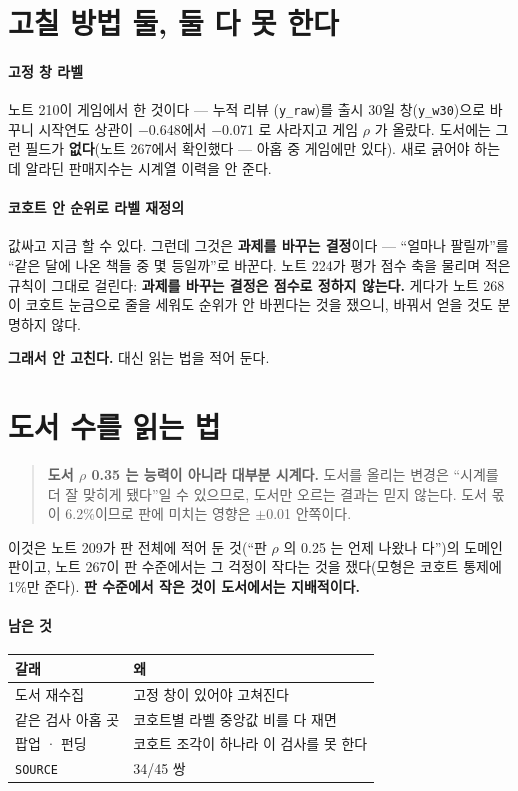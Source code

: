 \documentclass[10pt]{article}
\begin{document}
\section{고칠 방법 둘, 둘 다 못 한다}

\paragraph{고정 창 라벨} 노트 210이 게임에서 한 것이다 --- 누적 리뷰
(\texttt{y\_raw})를 출시 30일 창(\texttt{y\_w30})으로 바꾸니 시작연도 상관이
$-$0.648에서 $-$0.071 로 사라지고 게임 $\rho$ 가 올랐다. 도서에는 그런
필드가 \textbf{없다}(노트 267에서 확인했다 --- 아홉 중 게임에만 있다).
새로 긁어야 하는데 알라딘 판매지수는 시계열 이력을 안 준다.

\paragraph{코호트 안 순위로 라벨 재정의} 값싸고 지금 할 수 있다. 그런데
그것은 \textbf{과제를 바꾸는 결정}이다 --- ``얼마나 팔릴까''를 ``같은 달에
나온 책들 중 몇 등일까''로 바꾼다. 노트 224가 평가 점수 축을 물리며 적은
규칙이 그대로 걸린다: \textbf{과제를 바꾸는 결정은 점수로 정하지 않는다.}
게다가 노트 268이 코호트 눈금으로 줄을 세워도 순위가 안 바뀐다는 것을
쟀으니, 바꿔서 얻을 것도 분명하지 않다.

\textbf{그래서 안 고친다.} 대신 읽는 법을 적어 둔다.

\section{도서 수를 읽는 법}

\begin{quote}
\textbf{도서 $\rho$ 0.35 는 능력이 아니라 대부분 시계다.} 도서를 올리는
변경은 ``시계를 더 잘 맞히게 됐다''일 수 있으므로, 도서만 오르는 결과는
믿지 않는다. 도서 몫이 6.2\%이므로 판에 미치는 영향은 $\pm$0.01 안쪽이다.
\end{quote}

이것은 노트 209가 판 전체에 적어 둔 것(``판 $\rho$ 의 0.25 는 언제 나왔나
다'')의 도메인 판이고, 노트 267이 판 수준에서는 그 걱정이 작다는 것을
쟀다(모형은 코호트 통제에 1\%만 준다). \textbf{판 수준에서 작은 것이
도서에서는 지배적이다.}

\paragraph{남은 것}
\begin{center}\small
\begin{tabular}{ll}
\hline
갈래 & 왜 \\
\hline
도서 재수집 & 고정 창이 있어야 고쳐진다 \\
같은 검사 아홉 곳 & 코호트별 라벨 중앙값 비를 다 재면 \\
팝업 · 펀딩 & 코호트 조각이 하나라 이 검사를 못 한다 \\
\texttt{SOURCE} & 34/45 쌍 \\
\hline
\end{tabular}
\end{center}
\end{document}

